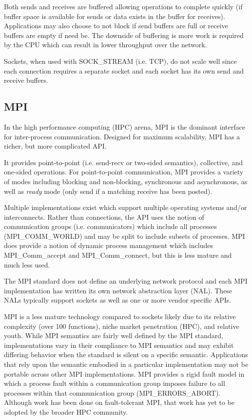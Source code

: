 \documentclass[conference]{IEEEtran}
\begin{document}
Both sends and receives are buffered allowing operations to complete quickly (if buffer
space is available for sends or data exists in the buffer for receives). Applications may
also choose to not block if send buffers are full or receive buffers are empty if need be.
The downside of buffering is more work is required by the CPU which can result in lower
throughput over the network.

Sockets, when used with SOCK\_STREAM (i.e. TCP), do not scale well since each connection
requires a separate socket and each socket has its own send and receive buffers.

\subsection{MPI} In the high performance computing (HPC) arena, MPI is the dominant
interface for inter-process communication. Designed for maximum scalability, MPI has a
richer, but more complicated API.

It provides point-to-point (i.e. send-recv or two-sided semantics), collective, and
one-sided operations. For point-to-point communication, MPI provides a variety of modes
including blocking and non-blocking, synchronous and asynchronous, as well as \emph{ready}
mode (only send if a matching receive has been posted).

Multiple implementations exist\cite{ompi, mpich2, mvapich, intel-mpi, platform-mpi}
which support multiple operating systems and/or interconnects.  Rather than connections,
the API uses the notion of communication groups (i.e.  communicators) which include all
processes (MPI\_COMM\_WORLD) and may be split to include subsets of processes. MPI does
provide a notion of dynamic process management which includes MPI\_Comm\_accept and
MPI\_Comm\_connect, but this is less mature and much less used.

The MPI standard does not define an underlying network protocol and each MPI
implementation has written its own network abstraction layer (NAL). These NALs typically
support sockets as well as one or more vendor specific APIs.

MPI is a less mature technology compared to sockets likely due to its
relative complexity (over 100 functions), niche market penetration
(HPC), and relative youth. While MPI semantics are fairly well defined
by the MPI standard, implementations vary in their compliance to MPI
semantics and may exhibit differing behavior when the standard is
silent on a specific semantic. Applications that rely upon the
semantic embodied in a particular implementation may not be portable
across other MPI implementations. MPI provides a rigid fault model in
which a process fault within a communication group imposes failure to
all processes within that communication group
(MPI\_ERRORS\_ABORT). Although work has been done on fault-tolerant
MPI\cite{ft-mpi, mpi-ft}, that work has yet to be adopted by the
broader HPC community. 
\end{document}
